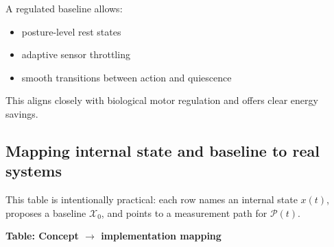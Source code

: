 \documentclass[11pt]{article}
\begin{document}
A regulated baseline allows:

\begin{itemize}
\item posture-level rest states
\item adaptive sensor throttling
\item smooth transitions between action and quiescence
\end{itemize}

This aligns closely with biological motor regulation and offers clear energy savings.

\subsection{Mapping internal state and baseline to real systems}
This table is intentionally practical: each row names an internal state \(x(t)\), proposes a baseline \(\mathcal{X}_0\), and points to a measurement path for \(\mathcal{P}(t)\).

\textbf{Table: Concept \(\to\) implementation mapping}
\end{document}
